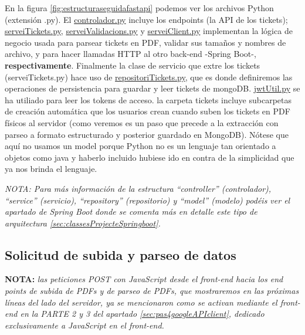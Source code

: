 \documentclass[a4paper,12pt]{report}
\begin{document}
	 En la figura \ref{fig:estructuraseguidafastapi} podemos ver los archivos Python (extensión .py). El \href{https://github.com/blackcub3s/mercApp/blob/main/APP%20WEB/__FastAPI__/app/controlador.py}{controlador.py} incluye los endpoints (la API de los tickets); \href{https://github.com/blackcub3s/mercApp/blob/main/APP%20WEB/__FastAPI__/app/serveiTickets.py}{serveiTickets.py}, \href{https://github.com/blackcub3s/mercApp/blob/main/APP%20WEB/__FastAPI__/app/serveiValidacions.py}{serveiValidacions.py} y \href{https://github.com/blackcub3s/mercApp/blob/main/APP%20WEB/__FastAPI__/app/serveiClient.py}{serveiClient.py} implementan la lógica de negocio usada para parsear tickets en PDF, validar sus tamaños y nombres de archivo, y para hacer llamadas HTTP al otro back-end -Spring Boot-, \textbf{respectivamente}. Finalmente la clase de servicio que extre los tickets (serveiTickets.py) hace uso de  \href{https://github.com/blackcub3s/mercApp/blob/main/APP%20WEB/__FastAPI__/app/repositoriTickets.py}{repositoriTickets.py}, que es donde definiremos las operaciones de persistencia para guardar y leer tickets de mongoDB. \href{https://github.com/blackcub3s/mercApp/blob/main/APP%20WEB/__FastAPI__/app/jwtUtil.py}{jwtUtil.py} se ha utiliado para leer los tokens de acceso. la carpeta tickets incluye subcarpetas de creación automática que los usuarios crean cuando suben los tickets en PDF físicos al servidor (como veremos es un paso que precede a la extracción con parseo a formato estructurado y posterior guardado en MongoDB). Nótese que aquí no usamos un model porque Python no es un lenguaje tan orientado a objetos como java y haberlo incluido hubiese ido en contra de la simplicidad que ya nos brinda el lenguaje.
	 
\textit{NOTA: Para más información de la estructura ``controller'' (controlador), ``service'' (servicio), ``repository'' (repositorio) y ``model'' (modelo) podéis ver el apartado de Spring Boot donde se comenta más en detalle este tipo de arquitectura \ref{sec:classesProjecteSpringboot}.}
	 
	   
	\subsection{Solicitud de subida y parseo de datos}
	\label{sec:solicitudDeExtraccion}
	
	
	\textbf{NOTA:} \textit{las peticiones POST con JavaScript desde el front-end hacia los end points de subida de PDFs y de parseo de PDFs, que mostraremos en las próximas líneas del lado del servidor, ya se mencionaron como se activan mediante el front-end en la PARTE 2 y 3 del apartado \ref{sec:pas4googleAPIclient}, dedicado exclusivamente a JavaScript en el front-end.}
	
\end{document}
